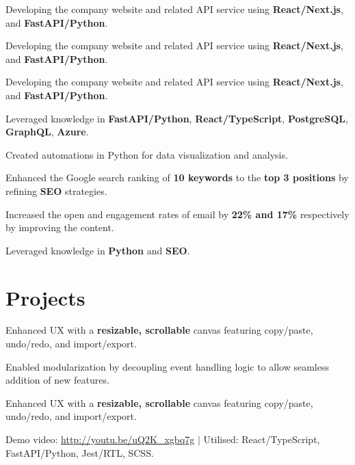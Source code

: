 \documentclass[a4paper,10pt]{article}
\begin{document}
\begin{tightitemize}
  \item Developing the company website and related API service using \textbf{React/Next.js}, and \textbf{FastAPI/Python}.
  \item Developing the company website and related API service using \textbf{React/Next.js}, and \textbf{FastAPI/Python}.
  \item Developing the company website and related API service using \textbf{React/Next.js}, and \textbf{FastAPI/Python}.
  \item Leveraged knowledge in \textbf{FastAPI/Python}, \textbf{React/TypeScript}, \textbf{PostgreSQL}, \textbf{GraphQL}, \textbf{Azure}.
\end{tightitemize}

\begin{tightitemize}
  \item Created automations in Python for data visualization and analysis.
  \item Enhanced the Google search ranking of \textbf{10 keywords} to the \textbf{top 3 positions} by refining \textbf{SEO} strategies.
  \item Increased the open and engagement rates of email by \textbf{22\% and 17\%} respectively by improving the content.
  \item Leveraged knowledge in \textbf{Python} and \textbf{SEO}.
\end{tightitemize}


\section{Projects}

\begin{tightitemize}
  \item Enhanced UX with a \textbf{resizable, scrollable} canvas featuring copy/paste, undo/redo, and import/export.
  \item Enabled modularization by decoupling event handling logic to allow seamless addition of new features.
  \item Enhanced UX with a \textbf{resizable, scrollable} canvas featuring copy/paste, undo/redo, and import/export.
  \item Demo video: \href{http://youtu.be/uQ2K\_xgbq7g}{\underline{http://youtu.be/uQ2K\_xgbq7g}} $|$ Utilised: React/TypeScript, FastAPI/Python, Jest/RTL, SCSS.
\end{tightitemize}
\end{document}
